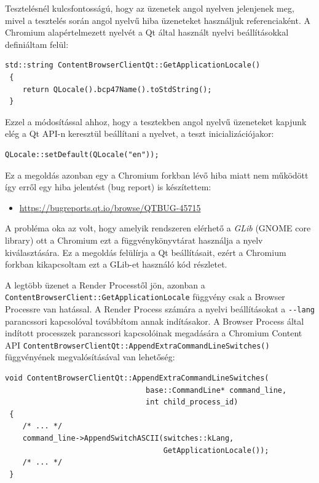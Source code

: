 \documentclass[12pt]{report}
\let\origurl\url
\renewcommand{\url}[1]{%
    \textcolor{blue}{\origurl{#1}}
}
\newcommand{\qtbug}[1]{%
    \textcolor{qtred}{\origurl{https://bugreports.qt.io/browse/QTBUG-#1}}
}
\begin{document}
Tesztelésnél kulcsfontosságú, hogy az üzenetek angol nyelven jelenjenek meg, mivel a
tesztelés során angol nyelvű hiba üzeneteket használjuk referenciaként. A Chromium
alapértelmezett nyelvét a Qt által használt nyelvi beállításokkal definiáltam felül:
\begin{lstlisting}[title=src/core/content\_browser\_client\_qt.cpp]
 std::string ContentBrowserClientQt::GetApplicationLocale()
 {
    return QLocale().bcp47Name().toStdString();
 }
\end{lstlisting}
Ezzel a módosítással ahhoz, hogy a tesztekben angol nyelvű üzeneteket kapjunk elég a Qt API-n
keresztül beállítani a nyelvet, a teszt inicializációjakor:
\begin{lstlisting}[title=tests/auto/quick/qmltests/tst\_qmltests.cpp]
 QLocale::setDefault(QLocale("en"));
\end{lstlisting}
Ez a megoldás azonban egy a Chromium forkban lévő hiba miatt nem működött így erről egy
hiba jelentést (bug report) is készítettem:
\begin{center}
    \begin{issuebox}
        \begin{itemize}
            \renewcommand{\labelitemi}{\textcolor{qtred}{$\blacktriangleright$}}
            \item \qtbug{45715}
        \end{itemize}
    \end{issuebox}
\end{center}
A probléma oka az volt, hogy amelyik rendszeren elérhető a \textit{GLib} (GNOME core library)
ott a Chromium ezt a függvénykönyvtárat használja a nyelv kiválasztására. Ez a megoldás
felülírja a Qt beállításait, ezért a Chromium forkban kikapcsoltam ezt a GLib-et használó
kód részletet.

A legtöbb üzenet a Render Processtől jön, azonban a
\texttt{ContentBrowserClient::GetApplicationLocale} függvény csak a Browser Processre van
hatással. A Render Process számára a nyelvi beállításokat a \texttt{-{}-lang} parancssori
kapcsolóval továbbítom annak indításakor. A Browser Process által indított processzek
parancssori kapcsolóinak megadására a Chromium Content API
\texttt{ContentBrowserClientQt::AppendExtraCommandLineSwitches()} függvényének
megvalósításával van lehetőség:
\begin{lstlisting}[title=src/core/content\_browser\_client\_qt.cpp]
 void ContentBrowserClientQt::AppendExtraCommandLineSwitches(
                                base::CommandLine* command_line,
                                int child_process_id)
 {
    /* ... */
    command_line->AppendSwitchASCII(switches::kLang,
                                    GetApplicationLocale());
    /* ... */
 }
\end{lstlisting}
\end{document}
